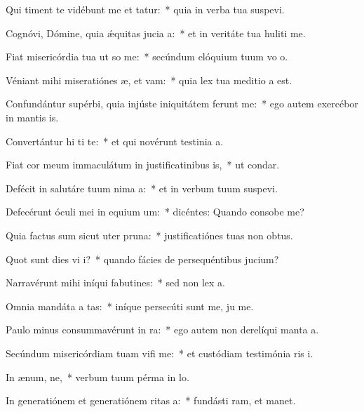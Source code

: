 \item Qui timent te vidébunt me et tatur:~* quia in verba tua suspevi.
\item Cognóvi, Dómine, quia ǽquitas jucia a:~* et in veritáte tua huliti me.
\item Fiat misericórdia tua ut so me:~* secúndum elóquium tuum vo o.
\item Véniant mihi miseratiónes æ, et vam:~* quia lex tua meditio a est.
\item Confundántur supérbi, quia injúste iniquitátem ferunt  me:~* ego autem exercébor in mantis is.
\item Convertántur hi ti te:~* et qui novérunt testinia a.
\item Fiat cor meum immaculátum in justificatinibus is,~* ut  condar.
\item Defécit in salutáre tuum nima a:~* et in verbum tuum suspevi.
\item Defecérunt óculi mei in equium um:~* dicéntes: Quando consobe me?
\item Quia factus sum sicut uter  pruna:~* justificatiónes tuas non  obtus.
\item Quot sunt dies vi i?~* quando fácies de persequéntibus  jucium?
\item Narravérunt mihi iníqui fabutines:~* sed non  lex a.
\item Omnia mandáta a tas:~* iníque persecúti sunt me, ju me.
\item Paulo minus consummavérunt  in ra:~* ego autem non derelíqui manta a.
\item Secúndum misericórdiam tuam vifi me:~* et custódiam testimónia ris i.
\item In ænum, ne,~* verbum tuum pérma in lo.
\item In generatiónem et generatiónem ritas a:~* fundásti ram, et manet.
